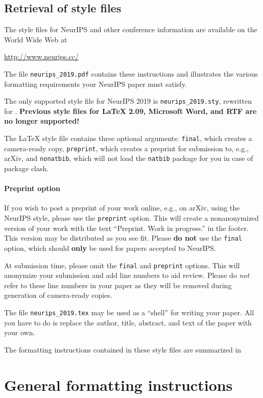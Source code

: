 \documentclass{article}
\begin{document}
\subsection{Retrieval of style files}

The style files for NeurIPS and other conference information are available on
the World Wide Web at
\begin{center}
  \url{http://www.neurips.cc/}
\end{center}
The file \verb+neurips_2019.pdf+ contains these instructions and illustrates the
various formatting requirements your NeurIPS paper must satisfy.

The only supported style file for NeurIPS 2019 is \verb+neurips_2019.sty+,
rewritten for \LaTeXe{}.  \textbf{Previous style files for \LaTeX{} 2.09,
  Microsoft Word, and RTF are no longer supported!}

The \LaTeX{} style file contains three optional arguments: \verb+final+, which
creates a camera-ready copy, \verb+preprint+, which creates a preprint for
submission to, e.g., arXiv, and \verb+nonatbib+, which will not load the
\verb+natbib+ package for you in case of package clash.

\paragraph{Preprint option}
If you wish to post a preprint of your work online, e.g., on arXiv, using the
NeurIPS style, please use the \verb+preprint+ option. This will create a
nonanonymized version of your work with the text ``Preprint. Work in progress.''
in the footer. This version may be distributed as you see fit. Please \textbf{do
  not} use the \verb+final+ option, which should \textbf{only} be used for
papers accepted to NeurIPS.

At submission time, please omit the \verb+final+ and \verb+preprint+
options. This will anonymize your submission and add line numbers to aid
review. Please do \emph{not} refer to these line numbers in your paper as they
will be removed during generation of camera-ready copies.

The file \verb+neurips_2019.tex+ may be used as a ``shell'' for writing your
paper. All you have to do is replace the author, title, abstract, and text of
the paper with your own.

The formatting instructions contained in these style files are summarized in

\section{General formatting instructions}
\label{gen_inst}
\end{document}
